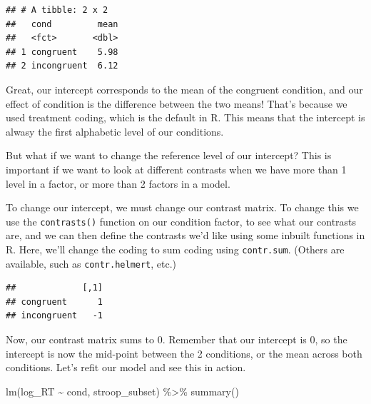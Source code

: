 \documentclass[
]{book}
\newenvironment{Shaded}{\begin{snugshade}}{\end{snugshade}}
\newcommand{\FunctionTok}[1]{\textcolor[rgb]{0.00,0.00,0.00}{#1}}
\newcommand{\NormalTok}[1]{#1}
\newcommand{\OtherTok}[1]{\textcolor[rgb]{0.56,0.35,0.01}{#1}}
\newcommand{\SpecialCharTok}[1]{\textcolor[rgb]{0.00,0.00,0.00}{#1}}
\begin{document}
\begin{verbatim}
## # A tibble: 2 x 2
##   cond         mean
##   <fct>       <dbl>
## 1 congruent    5.98
## 2 incongruent  6.12
\end{verbatim}

Great, our intercept corresponds to the mean of the congruent condition, and our effect of condition is the difference between the two means! That's because we used treatment coding, which is the default in R. This means that the intercept is alwasy the first alphabetic level of our conditions.

But what if we want to change the reference level of our intercept? This is important if we want to look at different contrasts when we have more than 1 level in a factor, or more than 2 factors in a model.

To change our intercept, we must change our contrast matrix. To change this we use the \texttt{contrasts()} function on our condition factor, to see what our contrasts are, and we can then define the contrasts we'd like using some inbuilt functions in R. Here, we'll change the coding to sum coding using \texttt{contr.sum}. (Others are available, such as \texttt{contr.helmert}, etc.)

\begin{Shaded}
\end{Shaded}

\begin{verbatim}
##             [,1]
## congruent      1
## incongruent   -1
\end{verbatim}

Now, our contrast matrix sums to 0. Remember that our intercept is 0, so the intercept is now the mid-point between the 2 conditions, or the mean across both conditions. Let's refit our model and see this in action.

\begin{Shaded}
\begin{Highlighting}[]
\FunctionTok{lm}\NormalTok{(log\_RT }\SpecialCharTok{\textasciitilde{}}\NormalTok{ cond, stroop\_subset) }\SpecialCharTok{\%\textgreater{}\%} \FunctionTok{summary}\NormalTok{()}
\end{Highlighting}
\end{Shaded}
\end{document}
